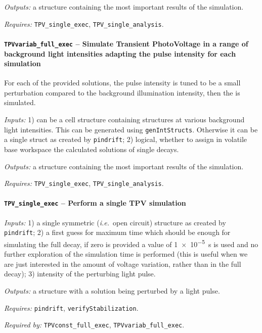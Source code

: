 		\textit{Outputs:} a structure containing the most important results of the simulation.

		\textit{Requires:} \texttt{TPV\_single\_exec}, \texttt{TPV\_single\_analysis}.



		\paragraph{\texttt{TPV\-variab\_full\_exec} -- Simulate Transient PhotoVoltage in a range of background light intensities adapting the pulse intensity for each simulation}
		For each of the provided solutions, the pulse intensity is tuned to be a small perturbation compared to the background illumination intensity, then the  is simulated.

		\textit{Inputs:} 1) can be a cell structure containing structures at various background
		light intensities. This can be generated using \texttt{gen\-Int\-Structs}.
		Otherwise it can be a single struct as created by \texttt{pin\-drift};
		2) logical, whether to assign in volatile base
		workspace the calculated solutions of single  decays.

		\textit{Outputs:} a structure containing the most important results of the simulation.

		\textit{Requires:} \texttt{TPV\_single\_exec}, \texttt{TPV\_single\_analysis}.


		\paragraph{\texttt{TPV\_single\_exec} -- Perform a single TPV simulation}

		\textit{Inputs:} 1) a single symmetric (\textsl{i.e.}\ open circuit) structure as created by \texttt{pin\-drift};
		2) a first guess for maximum time which should be enough for simulating the full decay, if zero is provided a value of \SI{1e-5}{\s} is used and no further exploration of the simulation time is performed (this is useful when we are just interested in the amount of voltage variation, rather than in the full decay);
		3) intensity of the perturbing light pulse.

		\textit{Outputs:} a structure with a solution being perturbed by a light pulse.

		\textit{Requires:} \texttt{pin\-drift}, \texttt{verify\-Stabilization}.

		\textit{Required by:} \texttt{TPV\-const\_full\_exec}, \texttt{TPV\-variab\_full\_exec}.




